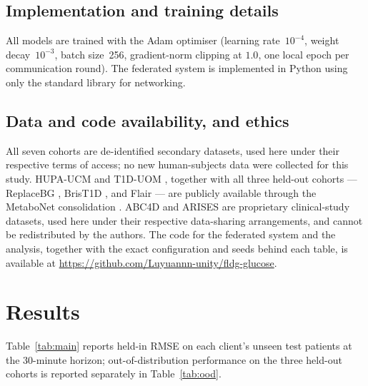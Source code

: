 \documentclass[10pt,letterpaper]{article}
\begin{document}
\subsection*{Implementation and training details}

All models are trained with the Adam optimiser (learning rate~$10^{-4}$, weight
decay~$10^{-3}$, batch size~256, gradient-norm clipping at $1.0$, one local
epoch per communication round). The
federated system is implemented in Python using only the standard library for
networking.

\subsection*{Data and code availability, and ethics}

All seven cohorts are de-identified secondary datasets, used here under their
respective terms of access; no new human-subjects data were collected for this
study. HUPA-UCM \cite{hidalgo2024hupaucm} and T1D-UOM \cite{alsuhaymi2025t1duom},
together with all three held-out cohorts --- ReplaceBG
\cite{aleppo2017replacebg}, BrisT1D \cite{james2025brist1d}, and Flair
\cite{jaeb_flair} --- are publicly available through the MetaboNet consolidation
\cite{wolff2026metabonet}. ABC4D \cite{abc4d_nct} and ARISES
\cite{zhu2022arises} are proprietary clinical-study datasets, used here under
their respective data-sharing arrangements, and cannot be redistributed by the
authors. The code for the federated system and the analysis, together with the
exact configuration and seeds behind each table, is available at
\url{https://github.com/Luyuannn-unity/fldg-glucose}.

\section*{Results}

Table~\ref{tab:main} reports held-in RMSE on each client's unseen test patients at
the 30-minute horizon; out-of-distribution performance on
the three held-out cohorts is reported separately in Table~\ref{tab:ood}.
\end{document}
